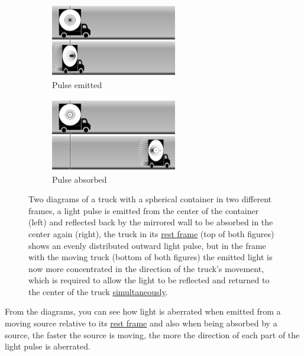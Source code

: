 \begin{figure}[htbp]
	\centering
	\begin{subfigure}{.49\textwidth}
		\centering
		\includegraphics[width=5.5cm]{images/pdf/Aberrated_lorrys_1.pdf}
		\caption{Pulse emitted}
		\label{fig: truck aberrated 1}
	\end{subfigure}
	\begin{subfigure}{.49\textwidth}
		\centering
		\includegraphics[width=5.5cm]{images/pdf/Aberrated_lorrys_2.pdf}
		\caption{Pulse absorbed}
		\label{fig: truck aberrated 2}
	\end{subfigure}
	\caption{Two diagrams of a truck with a spherical container in two different frames, a light pulse is emitted from the center of the container (left) and reflected back by the mirrored wall to be absorbed in the center again (right), the truck in its \protect\hyperlink{def-proper-frame}{rest frame} (top of both figures) shows an evenly distributed outward light pulse, but in the frame with the moving truck (bottom of both figures) the emitted light is now more concentrated in the direction of the truck's movement, which is required to allow the light to be reflected and returned to the center of the truck \protect\hyperlink{def-simultaneity}{simultaneously}.}
	\label{fig: truck aberrated}
\end{figure}

%

From the diagrams, you can see how light is aberrated when emitted from a moving source relative to its \hyperlink{def-proper-frame}{rest frame} and also when being absorbed by a source, the faster the source is moving, the more the direction of each part of the light pulse is aberrated.

